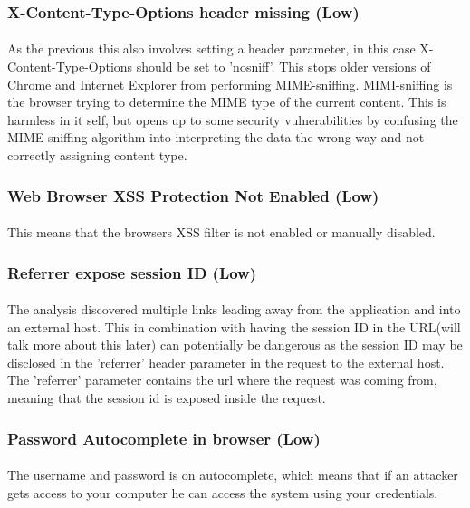 \documentclass[11pt,english,a4paper]{report}
\begin{document}
\subsubsection{X-Content-Type-Options header missing (Low)}
\paragraph{}
As the previous this also involves setting a header parameter, in this case X-Content-Type-Options should be set to 'nosniff'. 
This stops older versions of Chrome and Internet Explorer from performing MIME-sniffing. 
MIMI-sniffing is the browser trying to determine the MIME type of the current content. 
This is harmless in it self, but opens up to some security vulnerabilities by confusing the MIME-sniffing algorithm into interpreting the data the wrong way and not correctly assigning content type.

\subsubsection{Web Browser XSS Protection Not Enabled (Low)}
\paragraph{}
This means that the browsers XSS filter is not enabled or manually disabled.

\subsubsection{Referrer expose session ID (Low)}
\paragraph{}
The analysis discovered multiple links leading away from the application and into an external host.
This in combination with having the session ID in the URL(will talk more about this later) can potentially be dangerous as the session ID may be disclosed in the 'referrer' header parameter in the request to the external host.
The 'referrer' parameter contains the url where the request was coming from, meaning that the session id is exposed inside the request.

\subsubsection{Password Autocomplete in browser (Low)}
\paragraph{}
The username and password is on autocomplete, which means that if an attacker gets access to your computer he can access the system using your credentials.
\end{document}
